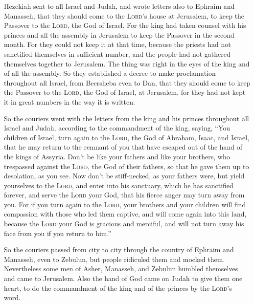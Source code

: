  Hezekiah sent to all Israel and Judah, and wrote letters
also to Ephraim and Manasseh, that they should come to the
\textsc{Lord}'s house at Jerusalem, to keep the Passover to the
\textsc{Lord}, the God of Israel.  For the king had taken
counsel with his princes and all the assembly in Jerusalem to keep the
Passover in the second month.  For they could not keep it
at that time, because the priests had not sanctified themselves in
sufficient number, and the people had not gathered themselves together
to Jerusalem.  The thing was right in the eyes of the king
and of all the assembly.  So they established a decree to
make proclamation throughout all Israel, from Beersheba even to Dan,
that they should come to keep the Passover to the \textsc{Lord}, the God
of Israel, at Jerusalem, for they had not kept it in great numbers in
the way it is written.

 So the couriers went with the letters from the king and
his princes throughout all Israel and Judah, according to the
commandment of the king, saying, ``You children of Israel, turn again to
the \textsc{Lord}, the God of Abraham, Isaac, and Israel, that he may
return to the remnant of you that have escaped out of the hand of the
kings of Assyria.  Don't be like your fathers and like
your brothers, who trespassed against the \textsc{Lord}, the God of
their fathers, so that he gave them up to desolation, as you see.
 Now don't be stiff-necked, as your fathers were, but
yield yourselves to the \textsc{Lord}, and enter into his sanctuary,
which he has sanctified forever, and serve the \textsc{Lord} your God,
that his fierce anger may turn away from you.  For if you
turn again to the \textsc{Lord}, your brothers and your children will
find compassion with those who led them captive, and will come again
into this land, because the \textsc{Lord} your God is gracious and
merciful, and will not turn away his face from you if you return to
him.''

 So the couriers passed from city to city through the
country of Ephraim and Manasseh, even to Zebulun, but people ridiculed
them and mocked them.  Nevertheless some men of Asher,
Manasseh, and Zebulun humbled themselves and came to Jerusalem.
 Also the hand of God came on Judah to give them one
heart, to do the commandment of the king and of the princes by the
\textsc{Lord}'s word.

